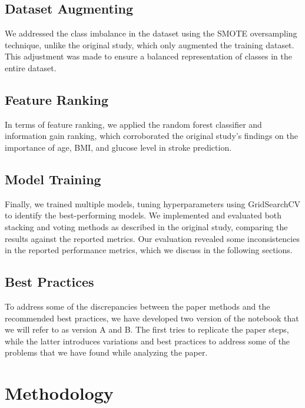 \documentclass{Configuration_Files/Template}
\begin{document}
\section{Dataset Augmenting}

We addressed the class imbalance in the dataset using the SMOTE oversampling technique, unlike the original study, which only augmented the training dataset. This adjustment was made to ensure a balanced representation of classes in the entire dataset.

\section{Feature Ranking}

In terms of feature ranking, we applied the random forest classifier and information gain ranking, which corroborated the original study's findings on the importance of age, BMI, and glucose level in stroke prediction.

\section{Model Training}

Finally, we trained multiple models, tuning hyperparameters using GridSearchCV to identify the best-performing models. We implemented and evaluated both stacking and voting methods as described in the original study, comparing the results against the reported metrics. Our evaluation revealed some inconsistencies in the reported performance metrics, which we discuss in the following sections.

\section{Best Practices}

To address some of the discrepancies between the paper methods and the recommended best practices, we have developed two version of the notebook that we will refer to as version A and B. The first tries to replicate the paper steps, while the latter introduces variations and best practices to address some of the problems that we have found while analyzing the paper.


\chapter{Methodology}
\end{document}

